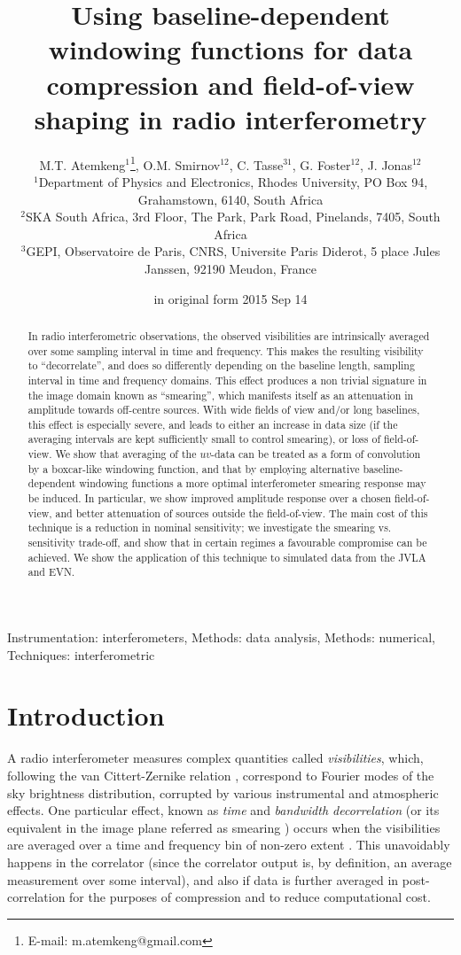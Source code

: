 \documentclass[useAMS,usenatbib]{mn2e}
\title[BDWFs for data compression and FoV shaping]{Using baseline-dependent windowing functions 
for data compression and field-of-view shaping in radio interferometry}
\author[M.T. Atemkeng, O.M. Smirnov, C. Tasse, G. Foster and J. Jonas]{M.T. 
Atemkeng$^{1}$\thanks{E-mail: m.atemkeng@gmail.com}, O.M. Smirnov$^{12}$, C. Tasse$^{31}$, G. Foster$^{12}$, J. Jonas$^{12}$ \\
$^1$Department of Physics and Electronics, Rhodes University, PO Box 94, Grahamstown, 6140, South Africa\\
$^2$SKA South Africa, 3rd Floor, The Park, Park Road, Pinelands, 7405, South Africa\\
$^3$GEPI, Observatoire de Paris, CNRS, Universite Paris Diderot, 5 place Jules Janssen, 92190 Meudon, France}
\begin{document}
\date{in original form 2015 Sep 14}

\pagerange{\pageref{firstpage}--\pageref{lastpage}} 

\maketitle

\label{firstpage}

\begin{abstract}


In radio interferometric observations, the observed visibilities are intrinsically averaged over some sampling interval
in time and frequency. 
This makes the resulting visibility to ``decorrelate'', and does so differently depending on the baseline length, sampling interval in  time and frequency domains. This effect produces a non trivial signature in the image domain known as ``smearing'', which manifests itself as an attenuation 
in amplitude towards off-centre sources. With wide fields of view and/or long baselines, this effect is especially severe,
and leads to either an increase in data size (if the averaging intervals are kept sufficiently small to control smearing), or 
loss of field-of-view. We show that averaging of the $uv$-data can be treated as a form of convolution by a boxcar-like 
windowing function, and that by employing alternative baseline-dependent windowing functions a more optimal interferometer 
smearing response may be induced. In particular, we show improved amplitude response over a chosen field-of-view, and 
better attenuation of sources outside the field-of-view. The main cost of this technique is a reduction in nominal 
sensitivity; we investigate the smearing vs. sensitivity trade-off, and show that in certain regimes a favourable 
compromise can be achieved. We show the application of this technique to simulated data from the JVLA and EVN.
\end{abstract}
\begin{keywords}
Instrumentation: interferometers, Methods: data analysis, Methods: numerical, Techniques: interferometric
\end{keywords}

\section[]{Introduction}

A radio interferometer measures complex quantities called \emph{visibilities}, which, following the van Cittert-Zernike 
relation \citep{thompson1999fundamentals,thompson2001fundamentals}, correspond to Fourier modes of the sky brightness distribution, corrupted by various instrumental 
and atmospheric effects. 
One particular effect, known as \emph{time} and \emph{bandwidth decorrelation} (or its equivalent in the image plane referred as smearing ) occurs 
when the visibilities are averaged over a time and frequency bin of non-zero extent \citep{bridle1989wide,bridle1999bandwidth}. This unavoidably happens in the correlator 
(since the correlator output is, by definition, an average measurement over some interval), and also if data is further 
averaged in post-correlation for the purposes of compression and to reduce computational cost.
\end{document}
